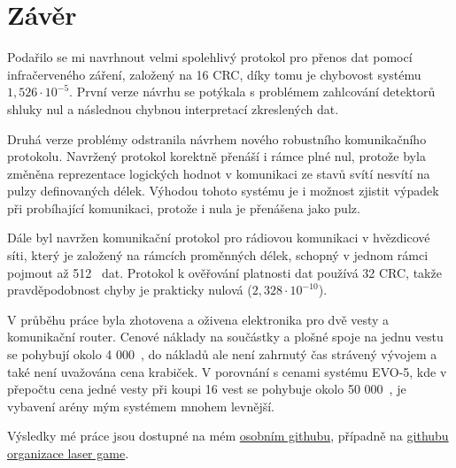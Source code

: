 \chapter{Závěr}

Podařilo se mi navrhnout velmi spolehlivý protokol pro přenos dat pomocí infračerveného záření, založený na 16 CRC, díky tomu je chybovost systému $1,526 \cdot 10^{-5}$. První verze návrhu se potýkala s problémem zahlcování detektorů shluky nul a následnou chybnou interpretací zkreslených dat.

Druhá verze problémy odstranila návrhem nového robustního komunikačního protokolu. Navržený protokol korektně přenáší i rámce plné nul, protože byla změněna reprezentace logických hodnot v komunikaci ze stavů svítí nesvítí na pulzy definovaných délek. Výhodou tohoto systému je i možnost zjistit výpadek při probíhající komunikaci, protože i nula je přenášena jako pulz.

Dále byl navržen komunikační protokol pro rádiovou komunikaci v hvězdicové síti, který je založený na rámcích proměnných délek, schopný v jednom rámci pojmout až 512~ dat. Protokol k ověřování platnosti dat používá 32 CRC, takže pravděpodobnost chyby je prakticky nulová ($2,328 \cdot 10^{-10}$).

V průběhu práce byla zhotovena a oživena elektronika pro dvě vesty a komunikační router. Cenové náklady na součástky a plošné spoje na jednu vestu se pohybují okolo 4 000~, do nákladů ale není zahrnutý čas strávený vývojem a také není uvažována cena krabiček. V porovnání s cenami systému EVO-5, kde v přepočtu cena jedné vesty při koupi 16 vest se pohybuje okolo 50 000~, je vybavení arény mým systémem mnohem levnější.

Výsledky mé práce jsou dostupné na mém \href{https://github.com/wykys}{osobním githubu}, případně na \href{https://github.com/laser-game}{githubu organizace laser game}.
